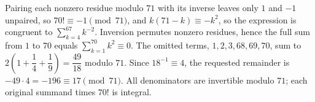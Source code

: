 Pairing each nonzero residue modulo $71$ with its inverse leaves only $1$ and $-1$ unpaired, so $70!\equiv-1\pmod{71}$, and $k(71-k)\equiv-k^2$, so the expression is congruent to $\sum_{k=4}^{67}k^{-2}$. Inversion permutes nonzero residues, hence the full sum from $1$ to $70$ equals $\sum_{k=1}^{70}k^2\equiv0$. The omitted terms, $1,2,3,68,69,70$, sum to $2(1+\dfrac{1}{4}+\dfrac{1}{9})=\dfrac{49}{18}$ modulo $71$. Since $18^{-1}\equiv4$, the requested remainder is $-49\cdot4=-196\equiv\boxed{17}\pmod{71}$. All denominators are invertible modulo $71$; each original summand times $70!$ is integral.
